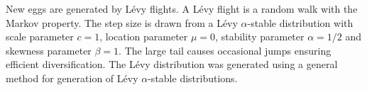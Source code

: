 \documentclass[a4paper, 5p, sort&compress]{elsarticle}%
\begin{document}
New eggs are generated by Lévy flights. A Lévy flight is a random walk with the
Markov property. The step size is drawn from a Lévy
$\alpha$-stable distribution%
with scale parameter $c = 1$, location parameter $\mu = 0$, stability
parameter $\alpha = 1/2$ and skewness parameter $\beta = 1$. The large tail
causes occasional jumps ensuring efficient diversification. The Lévy
distribution was generated using a general method for generation of
Lévy $\alpha$-stable distributions\cite{Weron1994}.






\end{document}
